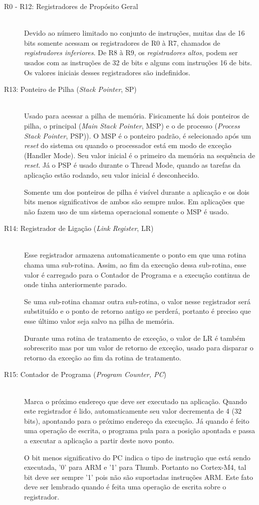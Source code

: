 \begin{description}
\item[R0 - R12: Registradores de Propósito Geral]\hfill \\
Devido ao número limitado no conjunto de instruções, muitas das de 16 bits somente acessam os registradores de R0 à R7, chamados de \emph{registradores inferiores}. De R8 à R9, os \emph{registradores altos}, podem ser usados com as instruções de 32 de bits e alguns com instruções 16 de bits. Os valores iniciais desses registradores são indefinidos.

\item[R13: Ponteiro de Pilha (\emph{Stack Pointer}, SP)]\hfill \\
Usado para acessar a pilha de memória. Fisicamente há dois ponteiros de pilha, o principal (\emph{Main Stack Pointer}, MSP) e o de processo (\emph{Process Stack Pointer}, PSP)). O MSP é o ponteiro padrão, é selecionado após um \emph{reset} do sistema ou quando o processador está em modo de exceção (Handler Mode). Seu valor inicial é o primeiro da memória na sequência de \emph{reset}. Já o PSP é usado durante o Thread Mode, quando as tarefas da aplicação estão rodando, seu valor inicial é desconhecido.

Somente um dos ponteiros de pilha é visível durante a aplicação e os dois bits menos significativos de ambos são sempre nulos. Em aplicações que não fazem uso de um sistema operacional somente o MSP é usado.

\item[R14: Registrador de Ligação (\emph{Link Register}, LR)]\hfill \\
Esse registrador armazena automaticamente o ponto em que uma rotina chama uma sub-rotina. Assim, ao fim da execução dessa sub-rotina, esse valor é carregado para o Contador de Programa e a execução continua de onde tinha anteriormente parado.

Se uma sub-rotina chamar outra sub-rotina, o valor nesse registrador será substituído e o ponto de retorno antigo se perderá, portanto é preciso que esse último valor seja salvo na pilha de memória.

Durante uma rotina de tratamento de exceção, o valor de LR é também sobrescrito mas por um valor de retorno de exceção, usado para disparar o retorno da exceção ao fim da rotina de tratamento.

\item[R15: Contador de Programa (\emph{Program Counter, PC})]\hfill \\
Marca o próximo endereço que deve ser executado na aplicação. Quando este registrador é lido, automaticamente seu valor decrementa de 4 (32 bits), apontando para o próximo endereço da execução. Já quando é feito uma operação de escrita, o programa pula para a posição apontada e passa a executar a aplicação a partir deste novo ponto.

O bit menos significativo do PC indica o tipo de instrução que está sendo executada, '0' para ARM e '1' para Thumb. Portanto no Cortex-M4, tal bit deve ser sempre '1' pois não são suportadas instruções ARM. Este fato deve ser lembrado quando é feita uma operação de escrita sobre o registrador.

\end{description}